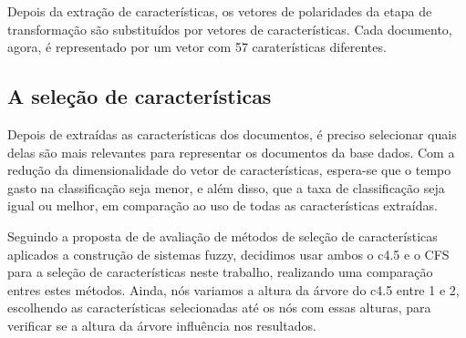 \documentclass[template.tex]{subfiles}
\begin{document}
Depois da extração de características, os vetores de polaridades da etapa de transformação são substituídos por vetores de características. Cada documento, agora, é representado por um vetor com 57 caraterísticas diferentes. 

\subsection{A seleção de características}
Depois de extraídas as características dos documentos, é preciso selecionar quais delas são mais relevantes para representar os documentos da base dados. Com a redução da dimensionalidade do vetor de características, espera-se que o tempo gasto na classificação seja menor, e além disso, que a taxa de classificação seja igual ou melhor, em comparação ao uso de todas as características extraídas.


Seguindo a proposta de  de avaliação de métodos de seleção de características aplicados a construção de sistemas fuzzy, decidimos usar ambos o c4.5 e o CFS para a seleção de características neste trabalho, realizando uma comparação entres estes métodos. Ainda, nós variamos a altura da árvore do c4.5 entre 1 e 2, escolhendo as características selecionadas até os nós com essas alturas, para verificar se a altura da árvore influência nos resultados.

\end{document}
